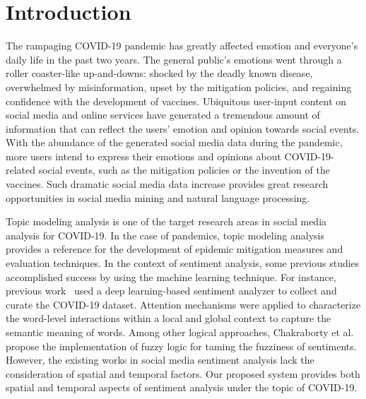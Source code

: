 \section{Introduction}
\label{sec:intro}
The rampaging COVID-19 pandemic has greatly affected emotion and everyone’s
daily life in the past two years. The general public’s emotions went through
a roller coaster-like up-and-downs: shocked by the deadly known disease,
overwhelmed by misinformation, upset by the mitigation policies, and
regaining confidence with the development of vaccines. Ubiquitous user-input
content on social media and online services have generated a tremendous
amount of information that can reflect the users’ emotion and opinion towards
social events. With the abundance of the generated social media data during
the pandemic, more users intend to express their emotions and opinions about
COVID-19-related social events, such as the mitigation policies or the
invention of the vaccines. Such dramatic social media data increase provides
great research opportunities in social media mining and natural language
processing.  

Topic modeling analysis is one of the target research areas in
social media analysis for COVID-19. In the case of pandemics, topic modeling analysis provides a reference for the development of epidemic
mitigation measures and evaluation techniques. In the context of sentiment
analysis, some previous studies accomplished success by using the machine
learning technique. For instance, previous work~\cite{kastrati2021deep} used
a deep learning-based sentiment analyzer to collect and curate the COVID-19
dataset. Attention mechanisms were applied to characterize the word-level
interactions within a local and global context to capture the semantic
meaning of words. Among other logical approaches, Chakraborty et al.~\cite
{chakraborty2020sentiment} propose the implementation of fuzzy logic for
taming the fuzziness of sentiments. However, the existing works in social
media sentiment analysis lack the consideration of spatial and temporal
factors. Our proposed system provides both spatial and temporal aspects of
sentiment analysis under the topic of COVID-19. 

